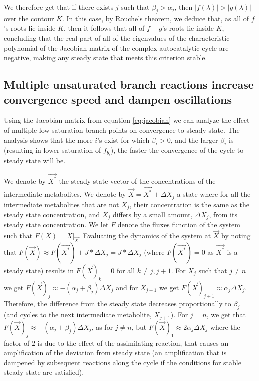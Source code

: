  We therefore get that if there exists $j$ such that  $\beta_j > \alpha_j$, then $|f(\lambda)|>|g(\lambda)|$ over the contour $K$.
 In this case, by Rouche's theorem, we deduce that, as all of $f$'s roots lie inside $K$, then it follows that all of $f-g$'s roots lie inside $K$, concluding that the real part of all of the eigenvalues of the characteristic polynomial of the Jacobian matrix of the complex autocatalytic cycle are negative, making any steady state that meets this criterion stable.

 \subsection{Multiple unsaturated branch reactions increase convergence speed and dampen oscillations}
 Using the Jacobian matrix from equation \ref{eq:jacobian} we can analyze the effect of multiple low saturation branch points on convergence to steady state.
 The analysis shows that the more $i$'s exist for which $\beta_i>0$, and the larger $\beta_i$ is (resulting in lower saturation of $f_{b_i}$), the faster the convergence of the cycle to steady state will be.

 We denote by $\vec{X^*}$ the steady state vector of the concentrations of the intermediate metabolites.
 We denote by $\vec{X}=\vec{X^*}+\Delta X_j$ a state where for all the intermediate metabolites that are not $X_j$, their concentration is the same as the steady state concentration, and $X_j$ differs by a small amount, $\Delta X_j$, from its steady state concentration.
 We let $F$ denote the fluxes function of the system such that $F(X)=\dot{X}\vert_{\vec{X}}$.
 Evaluating the dynamics of the system at $\vec{X}$ by noting that $F(\vec{X})\approx F(\vec{X^*})+J*\Delta X_j=J*\Delta X_j$ (where $F(\vec{X^*})=0$ as $\vec{X^*}$ is a steady state) results in $F(\vec{X})_k=0$ for all $k\neq j,j+1$.
 For $X_j$ such that $j\neq n$ we get $F(\vec{X})_j\approx -(\alpha_j+\beta_j)\Delta X_j$ and for $X_{j+1}$ we get $F(\vec{X})_{j+1}\approx \alpha_{j}\Delta X_j$.
 Therefore, the difference from the steady state decreases proportionally to $\beta_j$ (and cycles to the next intermediate metabolite, $X_{j+1}$).
 For $j=n$, we get that $F(\vec{X})_j\approx -(\alpha_j+\beta_j)\Delta X_j$, as for $j\neq n$, but $F(\vec{X})_{1}\approx 2\alpha_{j}\Delta X_j$ where the factor of $2$ is due to the effect of the assimilating reaction, that causes an amplification of the deviation from steady state (an amplification that is dampened by subsequent reactions along the cycle if the conditions for stable steady state are satisfied).


